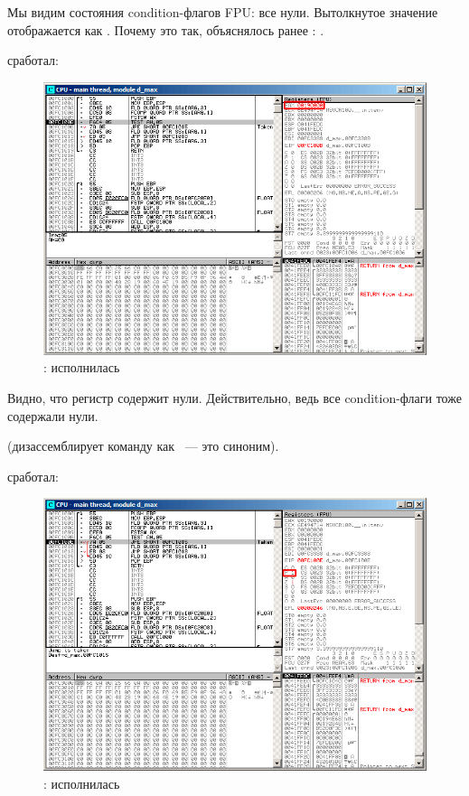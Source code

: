 Мы видим состояния condition-флагов \ac{FPU}: 
все нули.
Вытолкнутое значение отображается как . Почему это так, объяснялось ранее%
: 
.

\clearpage
\FNSTSW сработал:
\begin{figure}[H]
\centering
\includegraphics[scale=\FigScale]{patterns/12_FPU/3_comparison/x86/MSVC/olly1_3.png}
\caption{\olly: \FNSTSW исполнилась}
\label{fig:FPU_comparison_case1_olly3}
\end{figure}

Видно, что регистр  содержит нули. Действительно, ведь все condition-флаги тоже содержали нули.

(\olly дизассемблирует команду \FNSTSW как ~---%
 это синоним).

\clearpage
\TEST сработал:

\begin{figure}[H]
\centering
\includegraphics[scale=\FigScale]{patterns/12_FPU/3_comparison/x86/MSVC/olly1_4.png}
\caption{\olly: \TEST исполнилась}
\label{fig:FPU_comparison_case1_olly4}
\end{figure}

